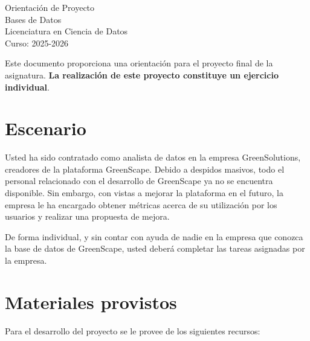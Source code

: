 \documentclass[10pt]{article}
\date{\displaydate{date}}
\begin{document}
	
	
	\begin{centering}
				
		\huge Orientación de Proyecto \\[2mm]
		
		\small Bases de Datos\\
		Licenciatura en Ciencia de Datos\\
		Curso: 2025-2026
		
	\end{centering}
	
	\vspace{2mm}
	
	Este documento proporciona una orientación para el proyecto final de la asignatura. \textbf{La realización de este proyecto constituye un ejercicio individual}.
	
	\section*{Escenario}
	
	Usted ha sido contratado como analista de datos en la empresa GreenSolutions, creadores de la plataforma GreenScape. Debido a despidos masivos, todo el personal relacionado con el desarrollo de GreenScape ya no se encuentra disponible. Sin embargo, con vistas a mejorar la plataforma en el futuro, la empresa le ha encargado obtener métricas acerca de su utilización por los usuarios y realizar una propuesta de mejora. 
	
	De forma individual, y sin contar con ayuda de nadie en la empresa que conozca la base de datos de GreenScape, usted deberá completar las tareas asignadas por la empresa.
	
	\section*{Materiales provistos}
	
	Para el desarrollo del proyecto se le provee de los siguientes recursos:
	
\end{document}
